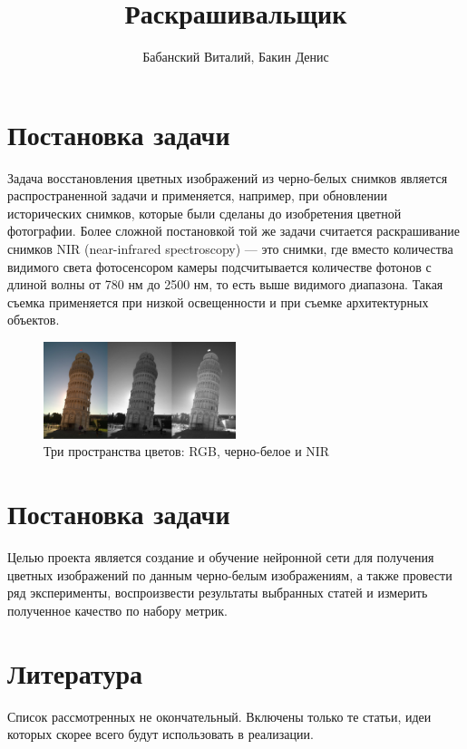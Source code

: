 \documentclass[14pt]{article}
\title{Раскрашивальщик}
\author{Бабанский Виталий, Бакин Денис}
\begin{document}
\maketitle


\section{Постановка задачи}

Задача восстановления цветных изображений из черно-белых снимков является распространенной задачи и применяется, например,
при обновлении исторических снимков, которые были сделаны до изобретения цветной фотографии.
Более сложной постановкой той же задачи считается раскрашивание снимков NIR (near-infrared spectroscopy) ---
это снимки, где вместо количества видимого света фотосенсором камеры подсчитывается количестве фотонов с длиной волны
от 780 нм до 2500 нм, то есть выше видимого диапазона. Такая съемка применяется при низкой освещенности и
при съемке архитектурных объектов.

\begin{figure}[H]
    \centering
    \includegraphics[width=0.5\textwidth]{resources/pisa_tower_3_colorspaces.jpg}
    \caption{Три пространства цветов: RGB, черно-белое и NIR}
    \label{fig:id_figura}
\end{figure}


\section{Постановка задачи}
Целью проекта является создание и обучение нейронной сети для получения цветных изображений по данным черно-белым изображениям,
а также провести ряд эксперименты, воспроизвести результаты выбранных статей и измерить полученное качество по набору метрик.


\section{Литература}
Список рассмотренных не окончательный. Включены только те статьи, идеи которых скорее всего будут использовать в реализации.
\end{document}
